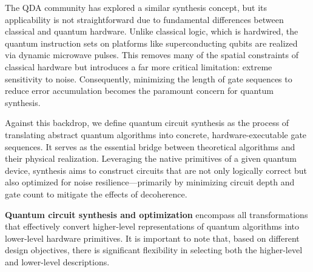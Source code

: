 \documentclass[a4paper,onecolumn,11pt,unpublished]{quantumarticle}
\begin{document}
The QDA community has explored a similar synthesis concept, but its applicability is not straightforward due to fundamental differences between classical and quantum hardware. Unlike classical logic, which is hardwired, the quantum instruction sets on platforms like superconducting qubits are realized via dynamic microwave pulses. This removes many of the spatial constraints of classical hardware but introduces a far more critical limitation: extreme sensitivity to noise. Consequently, minimizing the length of gate sequences to reduce error accumulation becomes the paramount concern for quantum synthesis.

Against this backdrop, we define quantum circuit synthesis as the process of translating abstract quantum algorithms into concrete, hardware-executable gate sequences. It serves as the essential bridge between theoretical algorithms and their physical realization. Leveraging the native primitives of a given quantum device, synthesis aims to construct circuits that are not only logically correct but also optimized for noise resilience---primarily by minimizing circuit depth and gate count to mitigate the effects of decoherence.



\textbf{Quantum circuit synthesis and optimization} encompass all transformations that effectively convert higher-level representations of quantum algorithms into lower-level hardware primitives. It is important to note that, based on different design objectives, there is significant flexibility in selecting both the higher-level and lower-level descriptions.
\end{document}
